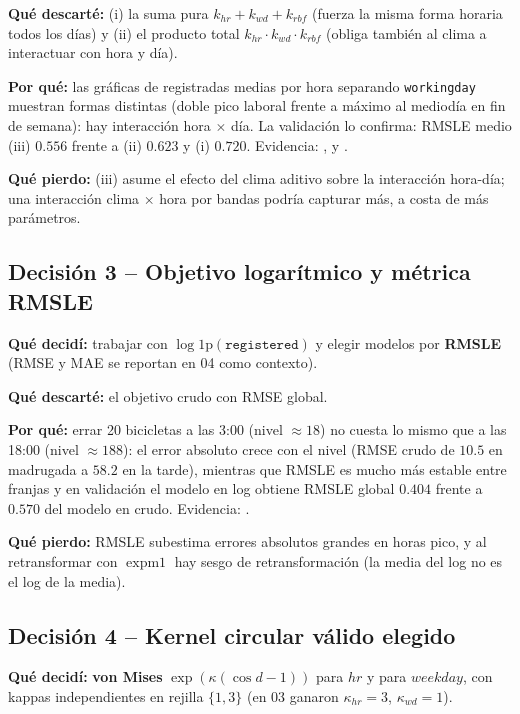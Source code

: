 \textbf{Qué descarté:} (i) la suma pura $k_{hr}+k_{wd}+k_{rbf}$ (fuerza la
misma forma horaria todos los días) y (ii) el producto total
$k_{hr}\cdot k_{wd}\cdot k_{rbf}$ (obliga también al clima a interactuar con
hora y día).

\textbf{Por qué:} las gráficas de registradas medias por hora separando
\texttt{workingday} muestran formas distintas (doble pico laboral frente a
máximo al mediodía en fin de semana): hay interacción hora $\times$ día. La
validación lo confirma: RMSLE medio (iii) $0.556$ frente a (ii) $0.623$ y
(i) $0.720$. Evidencia: ,
 y
.

\textbf{Qué pierdo:} (iii) asume el efecto del clima aditivo sobre la
interacción hora-día; una interacción clima $\times$ hora por bandas podría
capturar más, a costa de más parámetros.

\subsection*{Decisión 3 -- Objetivo logarítmico y métrica RMSLE}

\textbf{Qué decidí:} trabajar con \textbf{$\log 1\mathrm{p}(\texttt{registered})$}
y elegir modelos por \textbf{RMSLE} (RMSE y MAE se reportan en 04 como
contexto).

\textbf{Qué descarté:} el objetivo crudo con RMSE global.

\textbf{Por qué:} errar 20 bicicletas a las 3:00 (nivel $\approx
18$) no cuesta lo mismo que a las 18:00 (nivel $\approx 188$): el error
absoluto crece con el nivel (RMSE crudo de $10.5$ en madrugada a $58.2$ en la
tarde), mientras que RMSLE es mucho más estable entre franjas y en
validación el modelo en log obtiene RMSLE global $0.404$ frente a $0.570$ del
modelo en crudo. Evidencia: .

\textbf{Qué pierdo:} RMSLE subestima errores absolutos grandes en horas pico,
y al retransformar con $\operatorname{expm1}$ hay sesgo de retransformación
(la media del log no es el log de la media).

\subsection*{Decisión 4 -- Kernel circular válido elegido}

\textbf{Qué decidí:} \textbf{von Mises} $\exp(\kappa(\cos d-1))$ para
$hr$ y para $weekday$, con kappas independientes en rejilla $\{1,3\}$ (en 03
ganaron $\kappa_{hr}=3$, $\kappa_{wd}=1$).

